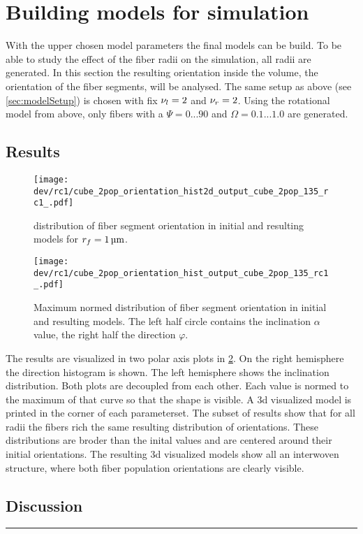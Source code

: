 \section{Building models for simulation}
% 
With the upper chosen model parameters the final models can be build.
To be able to study the effect of the fiber radii on the simulation, all radii are generated.
In this section the resulting orientation inside the volume, \ie{} the orientation of the fiber segments, will be analysed.
The same setup as above (see \cref{sec:modelSetup}) is chosen with fix $\textnormal{$\nu_{l}$}=\SI{2}{}$ and $\textnormal{$\nu_{r}$} = \SI{2}{}$.
Using the rotational model from above, only fibers with a $\Psi =  0...90$ and $\Omega = 0.1...1.0$ are generated.
% 
% 
% 
\subsection{Results}
% 
\begin{figure}[!t]
\centering
\texttt{[image: dev/rc1/cube\_2pop\_orientation\_hist2d\_output\_cube\_2pop\_135\_rc1\_.pdf]}
\caption[Model orientation histograms]{distribution of fiber segment orientation in initial and resulting models for $\fiberRadius = \SI{1}{\micro\meter}$.  }
\label{fig:modelOrientation}
\end{figure}
% 
\begin{figure}[p]
\centering
\texttt{[image: dev/rc1/cube\_2pop\_orientation\_hist\_output\_cube\_2pop\_135\_rc1\_.pdf]}
\caption[Model orientation histograms]{Maximum normed distribution of fiber segment orientation in initial and resulting models. The left half circle contains the inclination $\alpha$ value, the right half the direction $\varphi$. }
\label{fig:modelOrientationHist1d}
\end{figure}
% 
The results are visualized in two polar axis plots in \cref{fig:modelOrientationHist1d}. On the right hemisphere the direction histogram is shown.
The left hemisphere shows the inclination distribution.
Both plots are decoupled from each other. 
Each value is normed to the maximum of that curve so that the shape is visible.
A 3d visualized model is printed in the corner of each parameterset.
% 
The subset of results show that for all radii the fibers rich the same resulting distribution of orientations. 
These distributions are broder than the inital values and are centered around their initial orientations.
The resulting 3d visualized models show all an interwoven structure, where both fiber population orientations are clearly visible. 
%  
\subsection{Discussion}
% 
\vspace{5pt}
\hrule
\vspace{6pt}
% 
